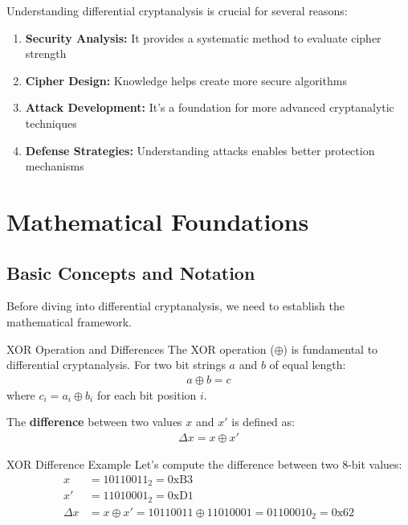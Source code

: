 \documentclass[12pt,a4paper]{article}
\theoremstyle{definition}
\newcommand{\diff}{\Delta}
\begin{document}
Understanding differential cryptanalysis is crucial for several reasons:

\begin{enumerate}
    \item \textbf{Security Analysis:} It provides a systematic method to evaluate cipher strength
    \item \textbf{Cipher Design:} Knowledge helps create more secure algorithms
    \item \textbf{Attack Development:} It's a foundation for more advanced cryptanalytic techniques
    \item \textbf{Defense Strategies:} Understanding attacks enables better protection mechanisms
\end{enumerate}

\section{Mathematical Foundations}

\subsection{Basic Concepts and Notation}

Before diving into differential cryptanalysis, we need to establish the mathematical framework.

\begin{definitionbox}{XOR Operation and Differences}
The XOR operation ($\oplus$) is fundamental to differential cryptanalysis. For two bit strings $a$ and $b$ of equal length:
\begin{align}
a \oplus b = c
\end{align}
where $c_i = a_i \oplus b_i$ for each bit position $i$.

The \textbf{difference} between two values $x$ and $x'$ is defined as:
\begin{align}
\diff x = x \oplus x'
\end{align}
\end{definitionbox}

\begin{examplebox}{XOR Difference Example}
Let's compute the difference between two 8-bit values:
\begin{align}
x &= 10110011_2 = \text{0xB3} \\
x' &= 11010001_2 = \text{0xD1} \\
\diff x &= x \oplus x' = 10110011 \oplus 11010001 = 01100010_2 = \text{0x62}
\end{align}
\end{examplebox}
\end{document}
